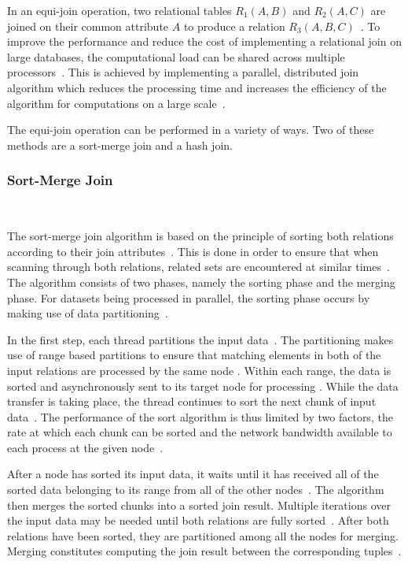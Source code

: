 \documentclass[12pt,twocolumn]{witseiepaper}
\begin{document}
In an equi-join operation, two relational tables $R_1(A,B)$ and $R_2(A,C)$ are joined on their common attribute $A$ to produce a relation $R_3(A,B,C)$~\cite{thomas_zurek_optimisation_1997}. To improve the performance and reduce the cost of implementing a relational join on large databases, the computational load can be shared across multiple processors~\cite{thomas_zurek_optimisation_1997}. This is achieved by implementing a parallel, distributed join algorithm which reduces the processing time and increases the efficiency of the algorithm for computations on a large scale~\cite{thomas_zurek_optimisation_1997}.

The equi-join operation can be performed in a variety of ways. Two of these methods are a sort-merge join and a hash join.

\subsubsection{Sort-Merge Join}\label{sortmerge}$   $

The sort-merge join algorithm is based on the principle of sorting both relations according to their join attributes~\cite{thomas_zurek_optimisation_1997}. This is done in order to ensure that when scanning through both relations, related sets are encountered at similar times~\cite{thomas_zurek_optimisation_1997}. The algorithm consists of two phases, namely the sorting phase and the merging phase. For datasets being processed in parallel, the sorting phase occurs by making use of data partitioning~\cite{dist}.

In the first step, each thread partitions the input data~\cite{dist}. The partitioning makes use of range based partitions to ensure that matching elements in both of the input relations are processed by the same node \cite{dist}. Within each range, the data is sorted and asynchronously sent to its target node for processing \cite{dist}. While the data transfer is taking place, the thread continues to sort the next chunk of input data~\cite{dist}. The performance of the sort algorithm is thus limited by two factors, the rate at which each chunk can be sorted and the network bandwidth available to each process at the given node~\cite{dist}.

After a node has sorted its input data, it waits until it has received all of the sorted data belonging to its range from all of the other nodes~\cite{dist}. The algorithm then merges the sorted chunks into a sorted join result. Multiple iterations over the input data may be needed until both relations are fully sorted~\cite{dist}. After both relations have been sorted, they are partitioned among all the nodes for merging. Merging constitutes computing the join result between the corresponding tuples~\cite{dist}.
\end{document}
